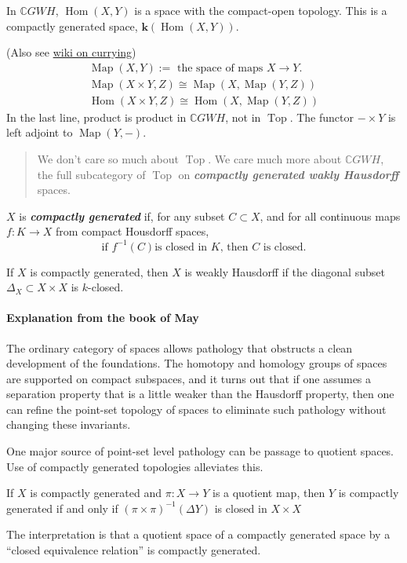 	In $\mathbb{C}GWH$, $\operatorname{Hom}(X,Y)$ is a space with the compact-open topology. This is a compactly generated space, $\mathbf{k}(\operatorname{Hom}(X,Y))$.
\begin{remark}
	(Also see \href{https://en.wikipedia.org/wiki/Currying#Function_spaces}{wiki on currying})
	\begin{align*}
		\operatorname{Map}(X,Y):=\text{ the space of maps }X\to Y.\\
		\operatorname{Map}(X\times Y,Z)\cong\operatorname{Map}(X,\operatorname{Map}(Y,Z))\\
		\operatorname{Hom}(X\times Y,Z)\cong \operatorname{Hom}(X,\operatorname{Map}(Y,Z))
	\end{align*}
	In the last line, product is product in $\mathbb{C}GWH$, not in $\operatorname{Top}$.
	The functor $-\times Y$ is left adjoint to $\operatorname{Map}(Y,-)$.
\end{remark}
\begin{quotation}
	We don't care so much about $\operatorname{Top}$. We care much more about $\mathbb{C}GWH$, the full subcategory of $\operatorname{Top}$ on \textbf{\textit{compactly generated wakly Hausdorff}} spaces.
\end{quotation}
\begin{defn}
	$X$ is \textbf{\textit{compactly generated}} if, for any subset $C\subset X$, and for all continuous maps $f:K\to X$ from compact Housdorff spaces, \[\text{if } f^{-1}(C) \text{is closed in }K\text{, then } C\text{ is closed}.\]
\end{defn}
\begin{claim}
	If $X$ is compactly generated, then $X$ is weakly Hausdorff if the diagonal subset $\Delta_X\subset X\times X$ is {\color{orange}$k$-closed}.
\end{claim}

\paragraph{Explanation from the book of May} The ordinary category of spaces allows pathology that obstructs a clean development of the foundations. The homotopy and homology groups of spaces are supported on compact subspaces, and it turns out that if one assumes a separation property that is a little weaker than the Hausdorff property, then one can refine the point-set topology of spaces to eliminate such pathology without changing these invariants.
	
	One major source of point-set level pathology can be passage to quotient spaces. Use of compactly generated topologies alleviates this.
	\begin{prop}
		If $X$ is compactly generated and $\pi:X\to Y$ is a quotient map, then $Y$ is compactly generated if and only if $(\pi\times \pi)^{-1}(\Delta Y)$ is closed in $X\times X$
	\end{prop}
	The interpretation is that a quotient space of a compactly generated space by a “closed equivalence relation” is compactly generated.

